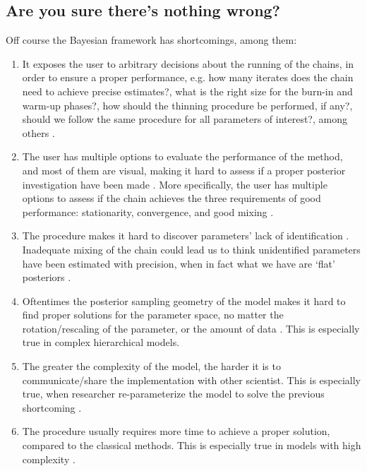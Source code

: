
\subsection{Are you sure there's nothing wrong?}
Off course the Bayesian framework has shortcomings, among them:

\begin{enumerate}	
	\item It exposes the user to arbitrary decisions about the running of the chains, in order to ensure a proper performance, e.g. how many iterates does the chain need to achieve precise estimates?, what is the right size for the burn-in and warm-up phases?, how should the thinning procedure be performed, if any?, should we follow the same procedure for all parameters of interest?, among others \cite{Skrondal_et_al_2004a}. 
	
	\item The user has multiple options to evaluate the performance of the method, and most of them are visual, making it hard to assess if a proper posterior investigation have been made \cite{Gelman_et_al_1996}. More specifically, the user has multiple options to assess if the chain achieves the three requirements of good performance: stationarity, convergence, and good mixing \cite{McElreath_2020}. 
	
	\item The procedure makes it hard to discover parameters' lack of identification \cite{Skrondal_et_al_2004a}. Inadequate mixing of the chain could lead us to think unidentified parameters have been estimated with precision, when in fact what we have are `flat' posteriors \cite{Keane_1992}.
	
	\item Oftentimes the posterior sampling geometry of the model makes it hard to find proper solutions for the parameter space, no matter the rotation/rescaling of the parameter, or the amount of data \cite{Betancourt_et_al_2013}. This is especially true in complex hierarchical models.
	
	\item The greater the complexity of the model, the harder it is to communicate/share the implementation with other scientist. This is especially true, when researcher re-parameterize the model to solve the previous shortcoming \cite{McElreath_2020}.
	
	\item The procedure usually requires more time to achieve a proper solution, compared to the classical methods. This is especially true in models with high complexity \cite{Tarazona_2013, Rivera_2019}.
\end{enumerate}

